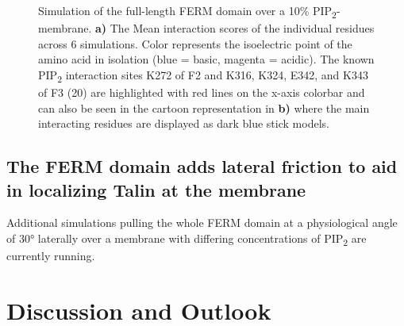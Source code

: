\documentclass[
  letterpaper,
  DIV=11,
  numbers=noendperiod]{scrartcl}
\begin{document}
\begin{figure}
\begin{minipage}[t]{\linewidth}
{}

\subcaption{\label{fig-ferm-memb-system}~}
\end{minipage}%

\caption{\label{fig-ferm-further}Simulation of the full-length FERM
domain over a 10\% PIP\textsubscript{2}-membrane. \textbf{a)} The Mean
interaction scores of the individual residues across 6 simulations.
Color represents the isoelectric point of the amino acid in isolation
(blue = basic, magenta = acidic). The known PIP\textsubscript{2}
interaction sites K272 of F2 and K316, K324, E342, and K343 of F3 (20)
are highlighted with red lines on the x-axis colorbar and can also be
seen in the cartoon representation in \textbf{b)} where the main
interacting residues are displayed as dark blue stick models.}

\end{figure}

\hypertarget{the-ferm-domain-adds-lateral-friction-to-aid-in-localizing-talin-at-the-membrane}{%
\subsection{The FERM domain adds lateral friction to aid in localizing
Talin at the
membrane}\label{the-ferm-domain-adds-lateral-friction-to-aid-in-localizing-talin-at-the-membrane}}

\begin{tcolorbox}[standard jigsaw,coltitle=black, titlerule=0mm, left=2mm, title=\textcolor{quarto-callout-note-color}{\faInfo}\hspace{0.5em}Note, arc=.35mm, bottomtitle=1mm, colframe=quarto-callout-note-color-frame, toptitle=1mm, bottomrule=.15mm, toprule=.15mm, colback=white, opacityback=0, rightrule=.15mm, leftrule=.75mm, opacitybacktitle=0.6, colbacktitle=quarto-callout-note-color!10!white]
Additional simulations pulling the whole FERM domain at a physiological
angle of 30° laterally over a membrane with differing concentrations of
PIP\textsubscript{2} are currently running.
\end{tcolorbox}

\hypertarget{discussion-and-outlook}{%
\section{Discussion and Outlook}\label{discussion-and-outlook}}
\end{document}

